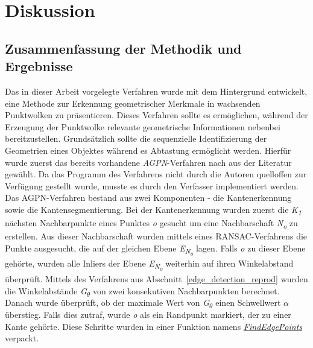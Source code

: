 
\chapter{Diskussion} \label{diskussion}
\section{Zusammenfassung der Methodik und Ergebnisse}
Das in dieser Arbeit vorgelegte Verfahren wurde mit dem Hintergrund entwickelt, eine Methode zur Erkennung geometrischer Merkmale in wachsenden Punktwolken zu präsentieren. Dieses Verfahren sollte es ermöglichen, während der Erzeugung der Punktwolke relevante geometrische Informationen nebenbei bereitzustellen. Grundsätzlich sollte die sequenzielle Identifizierung der Geometrien eines Objektes während es Abtastung ermöglicht werden. Hierfür wurde zuerst das bereits vorhandene \textit{AGPN}-Verfahren nach \autocite{ni_edge_2016} aus der Literatur gewählt. Da das Programm des Verfahrens nicht durch die Autoren quelloffen zur Verfügung gestellt wurde, musste es durch den Verfasser implementiert werden. Das AGPN-Verfahren bestand aus zwei Komponenten - die Kantenerkennung sowie die Kantensegmentierung. Bei der Kantenerkennung wurden zuerst die \textit{K\textsubscript{1}} nächsten Nachbarpunkte eines Punktes \textit{o} gesucht um eine Nachbarschaft \textit{N\textsubscript{o}} zu erstellen. Aus dieser Nachbarschaft wurden mittels eines RANSAC-Verfahrens die Punkte ausgesucht, die auf der gleichen Ebene \textit{E\textsubscript{N\textsubscript{o}}} lagen. Falls \textit{o} zu dieser Ebene gehörte, wurden alle Inliers der Ebene \textit{E\textsubscript{N\textsubscript{o}}} weiterhin auf ihren Winkelabstand überprüft. Mittels des Verfahrens aus Abschnitt~\ref{edge_detection_reprod} wurden die Winkelabstände \textit{G\textsubscript{$\theta$}} von zwei konsekutiven Nachbarpunkten berechnet. Danach wurde überprüft, ob der maximale Wert von \textit{G\textsubscript{$\theta$}} einen Schwellwert \textit{$\alpha$} überstieg. Falls dies zutraf, wurde \textit{o} als ein Randpunkt markiert, der zu einer Kante gehörte. Diese Schritte wurden in einer Funktion namens \textit{\hyperref[alg:find_edge_points]{FindEdgePoints}} verpackt. 

